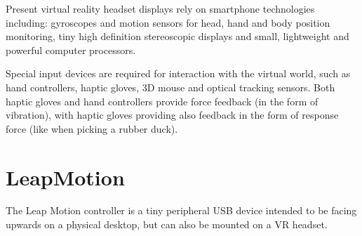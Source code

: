 \documentclass[12pt,a4paper,twoside]{report}
\begin{document}
Present virtual reality headset displays rely on smartphone technologies including: gyroscopes and motion sensors for head, hand and body position monitoring, tiny high definition stereoscopic displays and small, lightweight and powerful computer processors.

Special input devices are required for interaction with the virtual world, such as hand controllers, haptic gloves, 3D mouse and optical tracking sensors. Both haptic gloves and hand controllers provide force feedback (in the form of vibration), with haptic gloves providing also feedback in the form of response force (like when picking a rubber duck).

\section{LeapMotion}

The Leap Motion controller is a tiny peripheral USB device intended to be facing upwards on a physical desktop, but can also be mounted on a VR headset.
\end{document}
